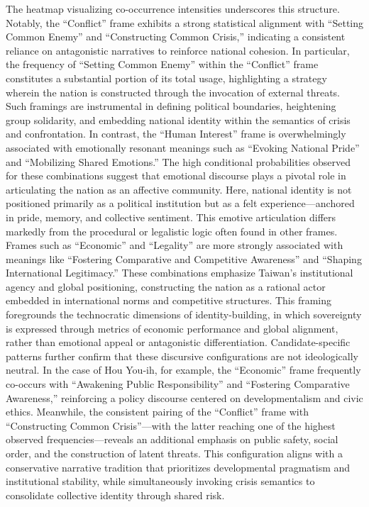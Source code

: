 \documentclass[man,12pt]{apa7}
\begin{document}
The heatmap visualizing co-occurrence intensities underscores this structure. Notably, the ``Conflict'' frame exhibits a strong statistical alignment with ``Setting Common Enemy'' and ``Constructing Common Crisis,'' indicating a consistent reliance on antagonistic narratives to reinforce national cohesion. In particular, the frequency of ``Setting Common Enemy'' within the ``Conflict'' frame constitutes a substantial portion of its total usage, highlighting a strategy wherein the nation is constructed through the invocation of external threats. Such framings are instrumental in defining political boundaries, heightening group solidarity, and embedding national identity within the semantics of crisis and confrontation. 
In contrast, the ``Human Interest'' frame is overwhelmingly associated with emotionally resonant meanings such as ``Evoking National Pride'' and ``Mobilizing Shared Emotions.'' The high conditional probabilities observed for these combinations suggest that emotional discourse plays a pivotal role in articulating the nation as an affective community. Here, national identity is not positioned primarily as a political institution but as a felt experience—anchored in pride, memory, and collective sentiment. This emotive articulation differs markedly from the procedural or legalistic logic often found in other frames. 
Frames such as ``Economic'' and ``Legality'' are more strongly associated with meanings like ``Fostering Comparative and Competitive Awareness'' and ``Shaping International Legitimacy.'' These combinations emphasize Taiwan's institutional agency and global positioning, constructing the nation as a rational actor embedded in international norms and competitive structures. This framing foregrounds the technocratic dimensions of identity-building, in which sovereignty is expressed through metrics of economic performance and global alignment, rather than emotional appeal or antagonistic differentiation. 
Candidate-specific patterns further confirm that these discursive configurations are not ideologically neutral. In the case of Hou You-ih, for example, the ``Economic'' frame frequently co-occurs with ``Awakening Public Responsibility'' and ``Fostering Comparative Awareness,'' reinforcing a policy discourse centered on developmentalism and civic ethics. Meanwhile, the consistent pairing of the ``Conflict'' frame with ``Constructing Common Crisis''—with the latter reaching one of the highest observed frequencies—reveals an additional emphasis on public safety, social order, and the construction of latent threats. This configuration aligns with a conservative narrative tradition that prioritizes developmental pragmatism and institutional stability, while simultaneously invoking crisis semantics to consolidate collective identity through shared risk. 
\end{document}
